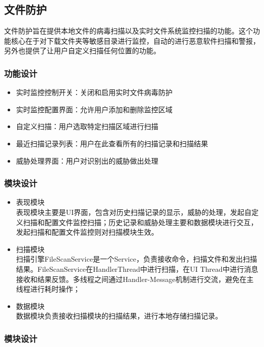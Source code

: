 \documentclass[format=final, language=chinese, degree=fyp]{hustthesis}
\begin{document}
\subsection{文件防护}

文件防护旨在提供本地文件的病毒扫描以及实时文件系统监控扫描的功能。这个功能核心在于对下载文件夹等敏感目录进行监控，自动的进行恶意软件扫描和警报，另外也提供了让用户自定义扫描任何位置的功能。

\subsubsection{功能设计}

\begin{itemize}
    \item 实时监控控制开关：关闭和启用实时文件病毒防护
    \item 实时监控配置界面：允许用户添加和删除监控区域
    \item 自定义扫描：用户选取特定扫描区域进行扫描
    \item 最近扫描记录列表：用户在此查看所有的扫描记录和扫描结果
    \item 威胁处理界面：用户对识别出的威胁做出处理
\end{itemize}

\subsubsection{模块设计}

\begin{itemize}
    \item 表现模块\\ 表现模块主要是UI界面，包含对历史扫描记录的显示，威胁的处理，发起自定义扫描和配置文件监控扫描；历史记录和威胁处理主要和数据模块进行交互，发起扫描和配置文件监控则对扫描模块生效。
    \item 扫描模块\\ 扫描引擎FileScanService是一个Service，负责接收命令，扫描文件和发出扫描结果。FileScanService在HandlerThread中进行扫描，在UI Thread中进行消息接收和结果反馈。多线程之间通过Handler-Message机制进行交流，避免在主线程进行耗时操作；
    \item 数据模块\\ 数据模块负责接收扫描模块的扫描结果，进行本地存储扫描记录。
\end{itemize}

\subsubsection{模块设计}
\end{document}
